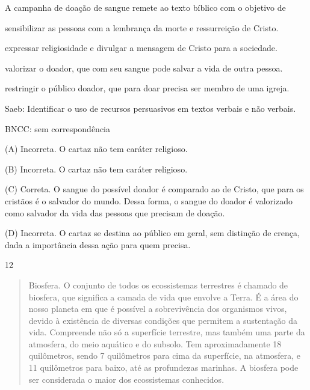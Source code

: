 
A campanha de doação de sangue remete ao texto bíblico com o objetivo de

\begin{escolha}
\item sensibilizar as pessoas com a lembrança da morte e ressurreição de
Cristo.
\item expressar religiosidade e divulgar a mensagem de Cristo para a
sociedade.
\item valorizar o doador, que com seu sangue pode salvar a vida de outra
pessoa.
\item restringir o público doador, que para doar precisa ser membro de uma
igreja.
\end{escolha}

Saeb: Identificar o uso de recursos persuasivos em textos verbais e não
verbais.

BNCC: sem correspondência

(A) Incorreta. O cartaz não tem caráter religioso.

(B) Incorreta. O cartaz não tem caráter religioso.

(C) Correta. O sangue do possível doador é comparado ao de Cristo, que
para os cristãos é o salvador do mundo. Dessa forma, o sangue do doador
é valorizado como salvador da vida das pessoas que precisam de doação.

(D) Incorreta. O cartaz se destina ao público em geral, sem distinção de
crença, dada a importância dessa ação para quem precisa.

\num{12}

\begin{quote}
Biosfera. O conjunto de todos os ecossistemas terrestres é chamado de
biosfera, que significa a camada de vida que envolve a Terra. É a área
do nosso planeta em que é possível a sobrevivência dos organismos vivos,
devido à existência de diversas condições que permitem a sustentação da
vida. Compreende não só a superfície terrestre, mas também uma parte da
atmosfera, do meio aquático e do subsolo. Tem aproximadamente 18
quilômetros, sendo 7 quilômetros para cima da superfície, na atmosfera,
e 11 quilômetros para baixo, até as profundezas marinhas. A biosfera
pode ser considerada o maior dos ecossistemas conhecidos.
\end{quote}



